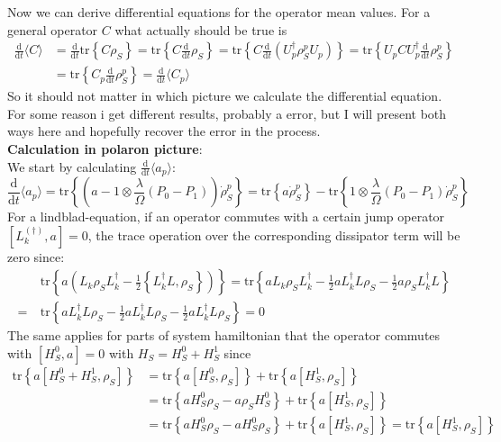 	Now we can derive differential equations for the operator mean values. For a general operator $C$ what actually should be true is
	\begin{align}
		\frac{\text{d}}{\text{d}t} \langle C \rangle &=	\frac{\text{d}}{\text{d}t} \text{tr}\left\{C \rho_S\right\} = \text{tr}\left\{C  \frac{\text{d}}{\text{d}t} \rho_S\right\} =	 \text{tr}\left\{C  \frac{\text{d}}{\text{d}t} (U_p^\dagger \rho_S^p U_p)\right\} =	\text{tr}\left\{ U_p C U_p^\dagger  \frac{\text{d}}{\text{d}t} \rho_S^p \right\} \\
		&=	\text{tr} \left\{C_p \frac{\text{d}}{\text{d}t} \rho_S^p \right\} =	\frac{\text{d}}{\text{d}t} \langle C_p \rangle
	\end{align}
	So it should not matter in which picture we calculate the differential equation. For some reason i get different results, probably a error, but I will present both ways here and hopefully recover the error in the process. \\
	\textbf{Calculation in polaron picture}: \\
	We start by calculating $\frac{\text{d}}{\text{d}t} \langle a_p \rangle$:
	\begin{equation}
		\frac{\text{d}}{\text{d}t} \langle a_p \rangle =	\text{tr} \left\{\left(a - 1 \otimes \frac{\lambda}{\Omega} (P_0 - P_1)\right) \dot{\rho}_S^p\right\} =	\text{tr} \left\{a \dot{\rho}_S^p\right\} - \text{tr} \left\{1 \otimes \frac{\lambda}{\Omega} (P_0 - P_1) \dot{\rho}_S^p\right\}
	\end{equation}
	For a lindblad-equation, if an operator commutes with a certain jump operator $\left[L_k^{(\dagger)}, a\right] =	0$, the trace operation over the corresponding dissipator term will be zero since:
	\begin{align}
		&~\text{tr} \left\{ a \left(L_k \rho_S L_k^\dagger - \frac{1}{2} \left\{L_k^\dagger L, \rho_S \right\}\right) \right\} =	\text{tr} \left\{ a L_k \rho_S L_k^\dagger - \frac{1}{2} a L_k^\dagger L \rho_S - \frac{1}{2} a \rho_S L_k^\dagger L \right\} \\
		=&~ \text{tr} \left\{ a L_k^\dagger L \rho_S - \frac{1}{2} a L_k^\dagger L \rho_S - \frac{1}{2} a L_k^\dagger L \rho_S \right\} = 0
	\end{align}
	The same applies for parts of system hamiltonian that the operator commutes with $ \left[H_S^0, a\right] = 0$ with $H_S =	H_S^0 + H_S^1$ since
	\begin{align*}
		\text{tr} \left\{a \left[H_S^0 + H_S^1, \rho_S\right]\right\} &=	\text{tr} \left\{a \left[H_S^0 , \rho_S\right]\right\} +\text{tr} \left\{a \left[H_S^1, \rho_S\right]\right\} \\
		&=	\text{tr} \left\{a H_S^0 \rho_S - a \rho_S H_S^0 \right\} + \text{tr} \left\{a \left[H_S^1, \rho_S\right]\right\} \\
		&= \text{tr} \left\{a H_S^0 \rho_S - a H_S^0 \rho_S  \right\} + \text{tr} \left\{a \left[H_S^1, \rho_S\right]\right\} =	\text{tr} \left\{a \left[H_S^1, \rho_S\right]\right\}
	\end{align*}
